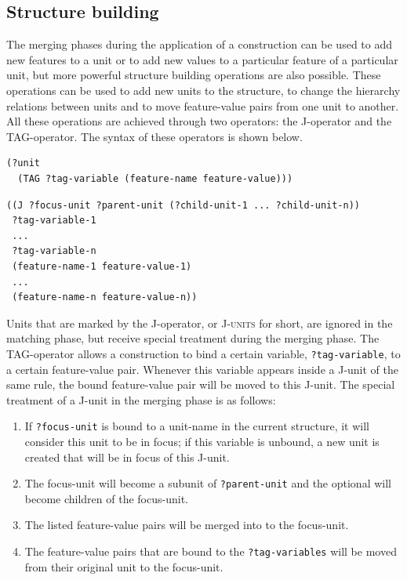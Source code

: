 \subsection{Structure building}
\largerpage[-1]

The merging phases during the application of a construction can be
used to add new features to a unit or to add new values to a
particular feature of a particular unit, but more powerful structure
building operations are also possible. These operations can be used to
add new units to the structure, to change the hierarchy relations
between units and to move feature-value pairs from one unit to
another. All these operations are achieved through two operators: the
J-operator \citep{debeule05hierarchy} and the TAG-operator. The syntax
of these operators is shown below.


\footnotesize
{}
\begin{lstlisting}
(?unit
  (TAG ?tag-variable (feature-name feature-value)))
\end{lstlisting}

\begin{lstlisting}
((J ?focus-unit ?parent-unit (?child-unit-1 ... ?child-unit-n))
 ?tag-variable-1 
 ...
 ?tag-variable-n
 (feature-name-1 feature-value-1)
 ...
 (feature-name-n feature-value-n))
\end{lstlisting}
\normalsize

\newpage
Units that are marked by the J-operator, or \textsc{J-units} for short,
are ignored in the matching phase, but receive special treatment
during the merging phase. The TAG-operator allows a construction to
bind a certain variable, {\footnotesize\tt ?tag-variable}, to a certain
feature-value pair. Whenever this variable appears inside a J-unit of
the same rule, the bound feature-value pair will be moved to this
J-unit. The special treatment of a J-unit in the merging phase is as
follows:

\begin{enumerate}
\item If {\footnotesize\tt ?focus-unit} is bound to a unit-name in the current
  structure, it will consider this unit to be in focus; if this
  variable is unbound, a new unit is created that will be in focus of
  this J-unit.
\item The focus-unit will become a subunit of {\footnotesize\tt ?parent-unit} and
  the optional  will become children of the
  focus-unit.
\item The listed feature-value pairs will be merged into to the
  focus-unit.
\item The feature-value pairs that are bound to the
  {\footnotesize\tt ?tag-variables} will be moved from their original unit to the
  focus-unit.
\end{enumerate}

